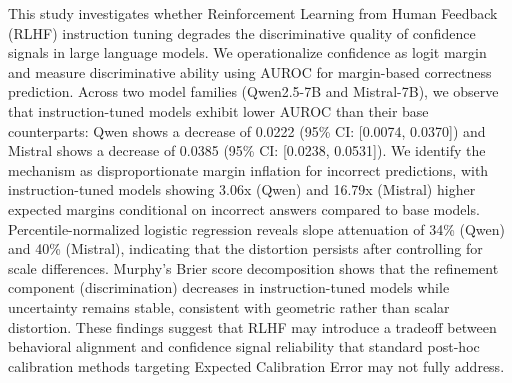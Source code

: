 
This study investigates whether Reinforcement Learning from Human Feedback (RLHF) instruction tuning degrades the discriminative quality of confidence signals in large language models. We operationalize confidence as logit margin and measure discriminative ability using AUROC for margin-based correctness prediction. Across two model families (Qwen2.5-7B and Mistral-7B), we observe that instruction-tuned models exhibit lower AUROC than their base counterparts: Qwen shows a decrease of 0.0222 (95\% CI: [0.0074, 0.0370]) and Mistral shows a decrease of 0.0385 (95\% CI: [0.0238, 0.0531]). We identify the mechanism as disproportionate margin inflation for incorrect predictions, with instruction-tuned models showing 3.06x (Qwen) and 16.79x (Mistral) higher expected margins conditional on incorrect answers compared to base models. Percentile-normalized logistic regression reveals slope attenuation of 34\% (Qwen) and 40\% (Mistral), indicating that the distortion persists after controlling for scale differences. Murphy's Brier score decomposition shows that the refinement component (discrimination) decreases in instruction-tuned models while uncertainty remains stable, consistent with geometric rather than scalar distortion. These findings suggest that RLHF may introduce a tradeoff between behavioral alignment and confidence signal reliability that standard post-hoc calibration methods targeting Expected Calibration Error may not fully address.
